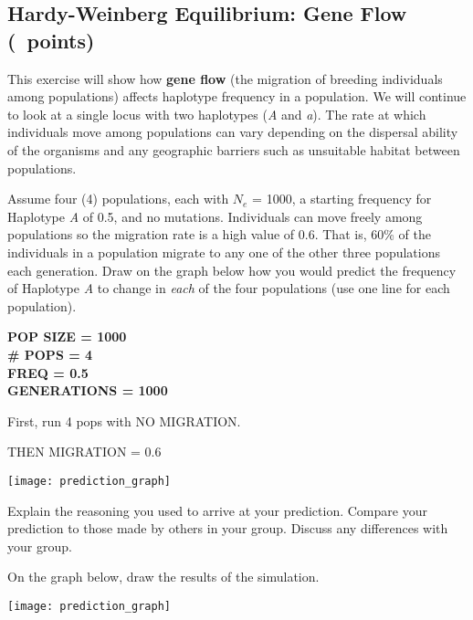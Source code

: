 \documentclass[11pt, addpoints]{exam}
\begin{document}
\subsection*{Hardy-Weinberg Equilibrium: Gene Flow (\numpoints\ points)}

This exercise will show how \textbf{gene flow} (the migration of
breeding individuals among populations) affects haplotype frequency
in a population. We will continue to look at a single locus with two
haplotypes (\emph{A} and \emph{a}). The rate at which individuals move 
among populations can vary depending on the dispersal ability of the 
organisms and any geographic barriers such as unsuitable habitat 
between populations.

\begin{questions}

\question
Assume four (4) populations, each with
$N_e$ = 1000, a starting frequency for Haplotype
\emph{A} of 0.5, and no mutations. Individuals can move freely among
populations so the migration rate is a high value of 0.6. That is, 60\%
of the individuals in a population migrate to any one of the other three
populations each generation. Draw on the graph below how you would
predict the frequency of Haplotype \emph{A} to change in \emph{each} of
the four populations (use one line for each population).

\ifprintanswers
	{\bfseries %
	POP SIZE = 1000\\
	\# POPS = 4\\
	FREQ = 0.5\\
	GENERATIONS = 1000
	
	First, run 4 pops with NO MIGRATION. 
	
	THEN MIGRATION = 0.6 }\vspace*{14\baselineskip}
\else
		\begin{center}
			\texttt{[image: prediction\_graph]}
		\end{center}
\fi

\question[1]
Explain the reasoning you used to arrive at your
prediction. Compare your prediction to those made by others in your
group. Discuss any differences with your group.

\newpage

\question On the graph below, draw the results of the simulation.

\begin{center}
	\texttt{[image: prediction\_graph]}
\end{center}


\end{questions}
\end{document}
